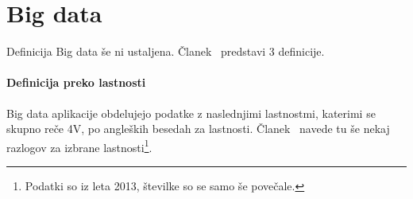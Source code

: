 \section{Big data}

Definicija Big data še ni ustaljena.
Članek~\cite{toward_scalable_systems_big_data_analytics} predstavi 3 definicije.

\paragraph{Definicija preko lastnosti}
Big data aplikacije obdelujejo podatke z naslednjimi lastnostmi, katerimi se
skupno reče 4V, po angleških besedah za lastnosti.
Članek~\cite{modeling_requirements_big_data} navede tu še nekaj razlogov za izbrane 
lastnosti\footnote{Podatki so iz leta 2013, številke so se samo še povečale.}.

